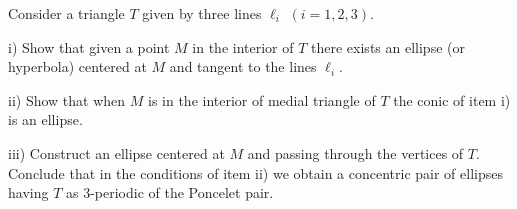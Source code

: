\begin{exercise}\label{exer:02-04-ponceletpair-center}
Consider a triangle $T$ given by three lines $\ell_i$ $(i=1,2,3)$. 

\noindent i) Show that given a point $M$ in the interior of $T$ there exists an ellipse (or hyperbola) centered at $M$ and tangent to the lines $\ell_i$.

\noindent ii) Show that when $M$ is in the interior of medial triangle of $T$ the conic of item i) is an ellipse.

\noindent iii) Construct an ellipse centered at $M$ and passing through the vertices of $T$. Conclude that in the conditions of item ii) we obtain a concentric pair of ellipses having $T$ as 3-periodic of the Poncelet pair.

\end{exercise}

\begin{exercise}\label{ex:23} 

\end{exercise}


\begin{exercise}\label{ex:24}

\end{exercise}